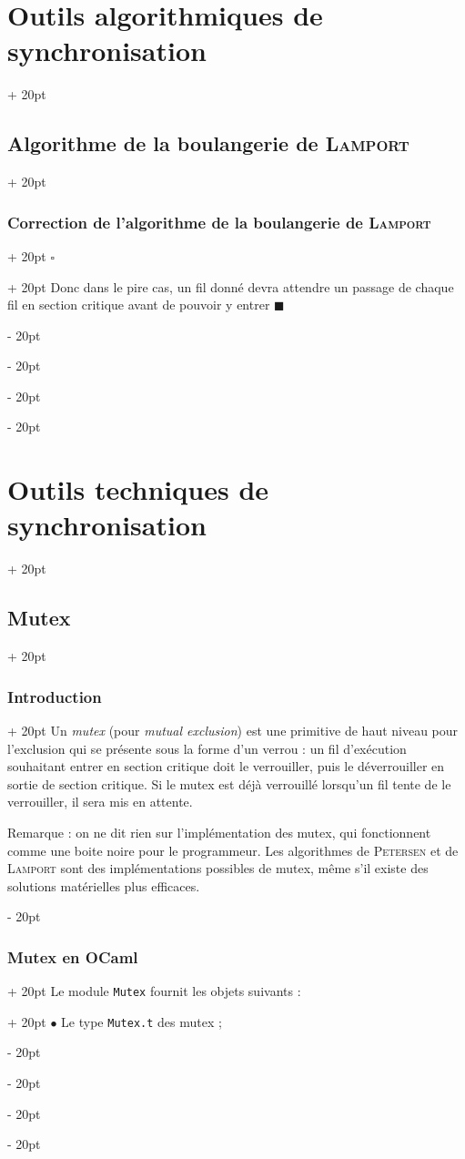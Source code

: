 \documentclass[a4paper, 12pt, twoside]{article}
\newcommand{\ind}[1][20pt]{\advance\leftskip + #1}
\newcommand{\deind}[1][20pt]{\advance\leftskip - #1}
\newenvironment{indt}[2][20pt]{#2 \par \ind[#1]}{\par \deind} %
\newenvironment{proof}[1][{}]{\begin{indt}{$\square$ #1}}{$\blacksquare$ \end{indt}}
\begin{document}
\begin{indt}{\section{Outils algorithmiques de synchronisation}}
\begin{indt}{\subsection{Algorithme de la boulangerie de \textsc{Lamport}}}
\begin{indt}{\subsubsection{Correction de l'algorithme de la boulangerie de \textsc{Lamport}}}
\begin{proof}
                    Donc dans le pire cas, un fil donné devra attendre un passage de chaque fil en section critique avant de pouvoir y entrer
                \end{proof}
            \end{indt}
        \end{indt}
    \end{indt}

    \vspace{12pt}
    
    \begin{indt}{\section{Outils techniques de synchronisation}}
        \begin{indt}{\subsection{Mutex}}
            \begin{indt}{\subsubsection{Introduction}}
                Un \textit{mutex} (pour \textit{mutual exclusion}) est une primitive de haut niveau pour l'exclusion qui se présente sous la forme d'un verrou : un fil d'exécution souhaitant entrer en section critique doit le verrouiller, puis le déverrouiller en sortie de section critique.
                Si le mutex est déjà verrouillé lorsqu'un fil tente de le verrouiller, il sera mis en attente.

                \vspace{12pt}
                
                Remarque : on ne dit rien sur l'implémentation des mutex, qui fonctionnent comme une boite noire pour le programmeur. Les algorithmes de \textsc{Petersen} et de \textsc{Lamport} sont des implémentations possibles de mutex, même s'il existe des solutions matérielles plus efficaces.
            \end{indt}

            \vspace{12pt}
            
            \begin{indt}{\subsubsection{Mutex en OCaml}}
                \begin{indt}{Le module \texttt{Mutex} fournit les objets suivants :}
                    $\bullet$ Le type \texttt{Mutex.t} des mutex ;


\end{indt}
\end{indt}
\end{indt}
\end{indt}
\end{document}
